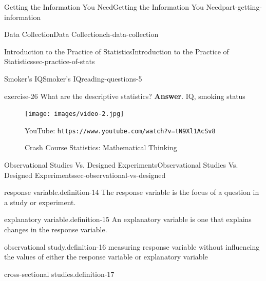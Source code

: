\documentclass[oneside,10pt,]{book}
\newcommand{\mono}[1]{\texttt{#1}}
\numberwithin{equation}{section}
\newlength{\qrsize}
\newlength{\previewwidth}
\begin{document}
\begin{partptx}{Getting the Information You Need}{}{Getting the Information You Need}{}{}{part-getting-information}
\begin{chapterptx}{Data Collection}{}{Data Collection}{}{}{ch-data-collection}
\begin{sectionptx}{Introduction to the Practice of Statistics}{}{Introduction to the Practice of Statistics}{}{}{sec-practice-of-stats}
\begin{reading-questions-subsection-numberless}{Smoker's IQ}{}{Smoker's IQ}{}{}{reading-questions-5}
\begin{divisionexercise}{3}{}{}{exercise-26}
What are the descriptive statistics? \textbf{Answer}.\hypertarget{answer-26}{}\quad%
IQ, smoking status\end{divisionexercise}%
\end{reading-questions-subsection-numberless}
\begin{figure}
\centering
\setlength{\qrsize}{9em}
\setlength{\previewwidth}{\linewidth}
\addtolength{\previewwidth}{-\qrsize}
\begin{tcbraster}[raster columns=2, raster column skip=1pt, raster halign=center, raster force size=false, raster left skip=0pt, raster right skip=0pt]%
\begin{tcolorbox}[previewstyle, width=\previewwidth]%
\texttt{[image: images/video-2.jpg]}%
\end{tcolorbox}%
\begin{tcolorbox}[qrstyle]%
{\hypersetup{urlcolor=black}}%
\end{tcolorbox}%
\begin{tcolorbox}[captionstyle]%
\small YouTube: \mono{https://www.youtube.com/watch?v=tN9Xl1AcSv8}\end{tcolorbox}%
\end{tcbraster}%
\caption{Crash Course Statistics: Mathematical Thinking\label{figure-2}}
\end{figure}
\end{sectionptx}
%
%
\typeout{************************************************}
\typeout{************************************************}
%
\begin{sectionptx}{Observational Studies Vs. Designed Experiments}{}{Observational Studies Vs. Designed Experiments}{}{}{sec-observational-vs-designed}
\begin{definition}{response variable.}{definition-14}%
The response variable is the focus of a question in a study or experiment.\end{definition}
\begin{definition}{explanatory variable.}{definition-15}%
An explanatory variable is one that explains changes in the response variable.\end{definition}
\begin{definition}{observational study.}{definition-16}%
measuring response variable without influencing the values of either the response variable or explanatory variable\end{definition}
\begin{definition}{cross-sectional studies.}{definition-17}%

\end{definition}
\end{sectionptx}
\end{chapterptx}
\end{partptx}
\end{document}
